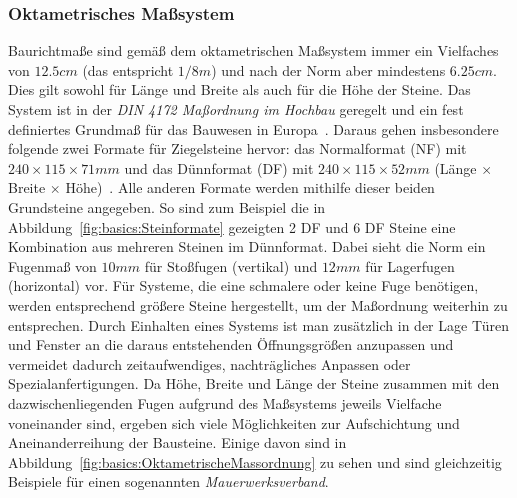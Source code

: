 \subsubsection*{Oktametrisches Maßsystem}
Baurichtmaße sind gemäß dem oktametrischen Maßsystem immer ein Vielfaches von \(12.5 cm\) (das entspricht \(1/8 m\)) und nach der Norm aber mindestens \(6.25cm\).
Dies gilt sowohl für Länge und Breite als auch für die Höhe der Steine.
Das System ist in der \textit{DIN 4172 Maßordnung im Hochbau} geregelt und ein fest definiertes Grundmaß für das Bauwesen in Europa~\cite{DIN417224}.
Daraus gehen insbesondere folgende zwei Formate für Ziegelsteine hervor:
das Normalformat (NF) mit \(240\times115\times71 mm\) und das Dünnformat (DF) mit \(240\times115\times52 mm\) (Länge $\times$ Breite $\times$ Höhe)~\cite{Moro2021}.
Alle anderen Formate werden mithilfe dieser beiden Grundsteine angegeben.
So sind zum Beispiel die in Abbildung~\ref{fig:basics:Steinformate} gezeigten 2 DF und 6 DF Steine eine Kombination aus mehreren Steinen im Dünnformat.
Dabei sieht die Norm ein Fugenmaß von \(10 mm\) für Stoßfugen (vertikal) und \(12 mm\) für Lagerfugen (horizontal) vor.
Für Systeme, die eine schmalere oder keine Fuge benötigen, werden entsprechend größere Steine hergestellt, um der Maßordnung weiterhin zu entsprechen.
Durch Einhalten eines Systems ist man zusätzlich in der Lage Türen und Fenster an die daraus entstehenden Öffnungsgrößen anzupassen und vermeidet dadurch zeitaufwendiges, nachträgliches Anpassen oder Spezialanfertigungen.
Da Höhe, Breite und Länge der Steine zusammen mit den dazwischenliegenden Fugen aufgrund des Maßsystems jeweils Vielfache voneinander sind, ergeben sich viele Möglichkeiten zur Aufschichtung und Aneinanderreihung der Bausteine.
Einige davon sind in Abbildung~\ref{fig:basics:OktametrischeMassordnung} zu sehen und sind gleichzeitig Beispiele für einen sogenannten \textit{Mauerwerksverband}.


